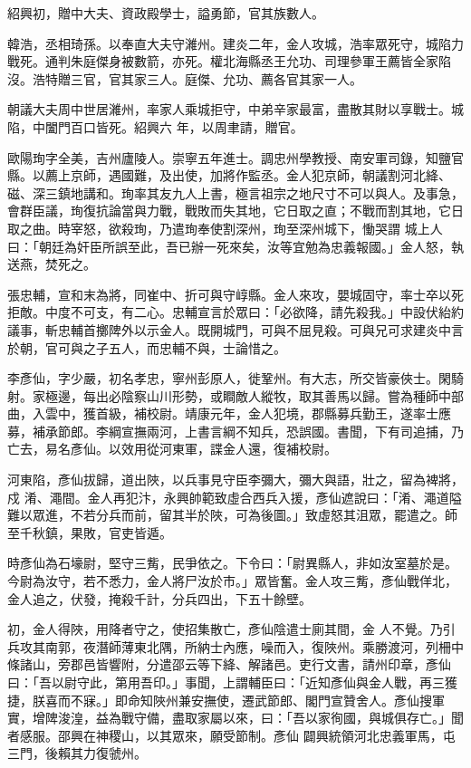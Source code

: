 \begin{pinyinscope}
 紹興初，贈中大夫、資政殿學士，謚勇節，官其族數人。



 韓浩，丞相琦孫。以奉直大夫守濰州。建炎二年，金人攻城，浩率眾死守，城陷力戰死。通判朱庭傑身被數箭，亦死。權北海縣丞王允功、司理參軍王薦皆全家陷沒。浩特贈三官，官其家三人。庭傑、允功、薦各官其家一人。



 朝議大夫周中世居濰州，率家人乘城拒守，中弟辛家最富，盡散其財以享戰士。城陷，中闔門百口皆死。紹興六
 年，以周聿請，贈官。



 歐陽珣字全美，吉州廬陵人。崇寧五年進士。調忠州學教授、南安軍司錄，知鹽官縣。以薦上京師，遇國難，及出使，加將作監丞。金人犯京師，朝議割河北絳、磁、深三鎮地講和。珣率其友九人上書，極言祖宗之地尺寸不可以與人。及事急，會群臣議，珣復抗論當與力戰，戰敗而失其地，它日取之直；不戰而割其地，它日取之曲。時宰怒，欲殺珣，乃遣珣奉使割深州，珣至深州城下，慟哭謂
 城上人曰：「朝廷為奸臣所誤至此，吾已辦一死來矣，汝等宜勉為忠義報國。」金人怒，執送燕，焚死之。



 張忠輔，宣和末為將，同崔中、折可與守崞縣。金人來攻，嬰城固守，率士卒以死拒敵。中度不可支，有二心。忠輔宣言於眾曰：「必欲降，請先殺我。」中設伏紿約議事，斬忠輔首擲陴外以示金人。既開城門，可與不屈見殺。可與兄可求建炎中言於朝，官可與之子五人，而忠輔不與，士論惜之。



 李彥仙，字少嚴，初名孝忠，寧州彭原人，徙鞏州。有大志，所交皆豪俠士。閑騎射。家極邊，每出必陰察山川形勢，或瞷敵人縱牧，取其善馬以歸。嘗為種師中部曲，入雲中，獲首級，補校尉。靖康元年，金人犯境，郡縣募兵勤王，遂率士應募，補承節郎。李綱宣撫兩河，上書言綱不知兵，恐誤國。書聞，下有司追捕，乃亡去，易名彥仙。以效用從河東軍，諜金人還，復補校尉。



 河東陷，彥仙拔歸，道出陜，以兵事見守臣李彌大，彌大與語，壯之，留為裨將，戍
 淆、澠間。金人再犯汴，永興帥範致虛合西兵入援，彥仙遮說曰：「淆、澠道隘難以眾進，不若分兵而前，留其半於陜，可為後圖。」致虛怒其沮眾，罷遣之。師至千秋鎮，果敗，官吏皆遁。



 時彥仙為石壕尉，堅守三觜，民爭依之。下令曰：「尉異縣人，非如汝室墓於是。今尉為汝守，若不悉力，金人將尸汝於市。」眾皆奮。金人攻三觜，彥仙戰佯北，金人追之，伏發，掩殺千計，分兵四出，下五十餘壁。



 初，金人得陜，用降者守之，使招集散亡，彥仙陰遣士廁其間，金
 人不覺。乃引兵攻其南郭，夜潛師薄東北隅，所納士內應，噪而入，復陜州。乘勝渡河，列柵中條諸山，旁郡邑皆響附，分遣邵云等下絳、解諸邑。吏行文書，請州印章，彥仙曰：「吾以尉守此，第用吾印。」事聞，上謂輔臣曰：「近知彥仙與金人戰，再三獲捷，朕喜而不寐。」即命知陜州兼安撫使，遷武節郎、閣門宣贊舍人。彥仙搜軍實，增陴浚湟，益為戰守備，盡取家屬以來，曰：「吾以家徇國，與城俱存亡。」聞者感服。邵興在神稷山，以其眾來，願受節制。彥仙
 闢興統領河北忠義軍馬，屯三門，後賴其力復虢州。




\end{pinyinscope}
